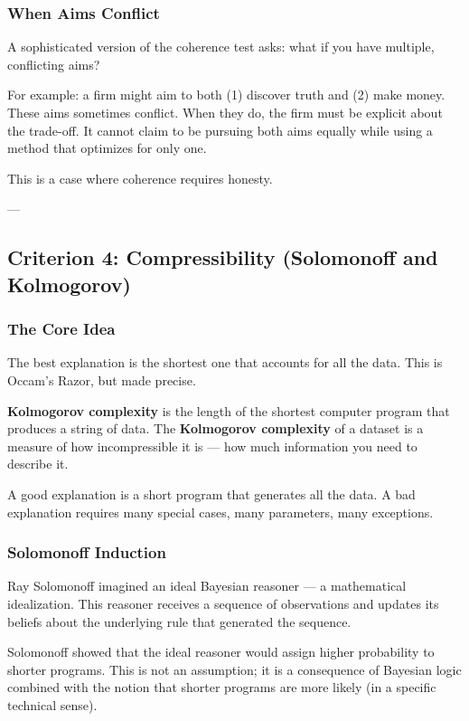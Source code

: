 \documentclass[11pt,letterpaper]{article}
\begin{document}
\subsubsection*{When Aims Conflict}

A sophisticated version of the coherence test asks: what if you have multiple, conflicting aims?

For example: a firm might aim to both (1) discover truth and (2) make money. These aims sometimes conflict. When they do, the firm must be explicit about the trade-off. It cannot claim to be pursuing both aims equally while using a method that optimizes for only one.

This is a case where coherence requires honesty.

---

\newpage

\subsection{Criterion 4: Compressibility (Solomonoff and Kolmogorov)}

\subsubsection*{The Core Idea}

The best explanation is the shortest one that accounts for all the data. This is Occam's Razor, but made precise.

\textbf{Kolmogorov complexity} is the length of the shortest computer program that produces a string of data. The \textbf{Kolmogorov complexity} of a dataset is a measure of how incompressible it is — how much information you need to describe it.

A good explanation is a short program that generates all the data. A bad explanation requires many special cases, many parameters, many exceptions.

\subsubsection*{Solomonoff Induction}

Ray Solomonoff imagined an ideal Bayesian reasoner — a mathematical idealization. This reasoner receives a sequence of observations and updates its beliefs about the underlying rule that generated the sequence.

Solomonoff showed that the ideal reasoner would assign higher probability to shorter programs. This is not an assumption; it is a consequence of Bayesian logic combined with the notion that shorter programs are more likely (in a specific technical sense).
\end{document}
